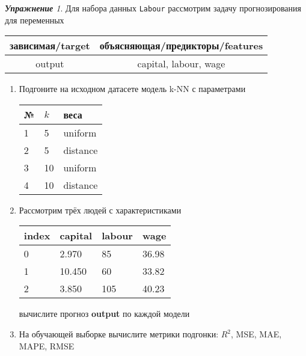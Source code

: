 \documentclass[a4,12pt]{article}
\theoremstyle{remark}
\newtheorem{exercise}{\textbf{Упражнение}}[section]
\begin{document}
\begin{exercise}
Для набора данных \texttt{Labour} рассмотрим задачу прогнозирования
для переменных
\begin{center}
	\begin{tabular}{|c|c|}\hline
		зависимая/target & объясняющая/предикторы/features \\ \hline
		output & capital, labour, wage \\ \hline
	\end{tabular}
\end{center}
\begin{enumerate}
	\item Подгоните на исходном датасете модель k-NN с параметрами
	\begin{center}
		\begin{tabular}{|l|l|l|}\hline
		№ & \(k\) & веса \\ \hline
		1 & 5 & uniform \\
		2 & 5 & distance \\
		3 & 10 & uniform \\
		4 & 10 & distance \\ \hline
		\end{tabular}
	\end{center}
	\item Рассмотрим трёх людей с характеристиками
	\begin{center}
		\begin{tabular}{|l||l|l|l|}\hline
			index & capital & labour & wage \\ \hline\hline
			0 & 2.970 & 85 & 36.98\\
			1 & 10.450 & 60 & 33.82  \\
			2 & 3.850 & 105 & 40.23\\ \hline
		\end{tabular}
	\end{center}
	вычислите прогноз \textbf{output} по каждой модели

	\item На обучающей выборке вычислите метрики подгонки: \(R^2\), 
	MSE, MAE, MAPE, RMSE
\end{enumerate}
\end{exercise}
\end{document}
